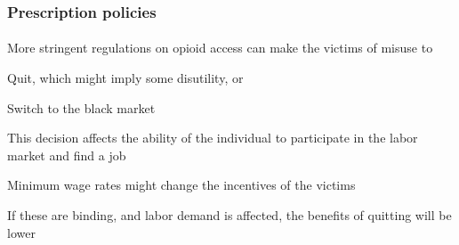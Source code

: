 \begin{frame}

    \frametitle{Prescription policies} %
    \framesubtitle{}  %
    \rmfamily %
    
    \begin{wideitemize}
        \item More stringent regulations on opioid access can make the victims of misuse to 
        \vspace{9pt}
        \begin{wideitemize}
            \item[\textcolor{fblu}{\textbullet}] \textcolor{fblu}{Quit}, which might imply some disutility, or
            \item[\textcolor{fblu}{\textbullet}] \textcolor{fblu}{Switch to the black market}
        \end{wideitemize}
        \item This decision affects the ability of the individual to participate in the labor market and find a job
        \item Minimum wage rates might change the incentives of the victims
        \item If these are \textcolor{fblu}{binding}, and labor demand is affected, the benefits of quitting will be lower
    \end{wideitemize}
    
\end{frame}

